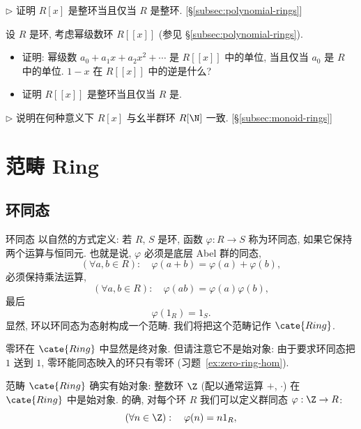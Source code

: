 \begin{prob}
\label{ex:poly-domain}
$\triangleright$ 证明 $R[x]$ 是整环当且仅当 $R$ 是整环. [\S\ref{subsec:polynomial-rings}]
\end{prob}

\begin{prob}
\label{ex:power-series}
设 $R$ 是环, 考虑幂级数环 $R[[x]]$ (参见 \S\ref{subsec:polynomial-rings}).
\begin{itemize}
	\item[(i)] 证明: 幂级数 $a_0 + a_1 x + a_2 x^2 + \cdots$ 是 $R[[x]]$ 中的单位, 当且仅当 $a_0$ 是 $R$ 中的单位. $1 - x$ 在 $R[[x]]$ 中的逆是什么?
	\item[(ii)] 证明 $R[[x]]$ 是整环当且仅当 $R$ 是.
\end{itemize}
\end{prob}

\begin{prob}
\label{ex:poly-monoid-ring}
$\triangleright$ 说明在何种意义下 $R[x]$ 与幺半群环 $R[\N]$ 一致. [\S\ref{subsec:monoid-rings}]
\end{prob}

\section{范畴 Ring}
\label{sec:category-ring}

\subsection{环同态}
\label{subsec:ring-hom}

环同态%
以自然的方式定义: 若 $R$, $S$ 是环, 函数 $\varphi : R \to S$ 称为环同态, 如果它保持两个运算与恒同元. 也就是说, $\varphi$ 必须是底层 Abel 群的同态,
\[
(\forall a, b \in R): \quad \varphi(a + b) = \varphi(a) + \varphi(b),
\]
必须保持乘法运算,
\[
(\forall a, b \in R): \quad \varphi(ab) = \varphi(a)\varphi(b),
\]
最后
\[
\varphi(1_R) = 1_S.
\]
显然, 环以环同态为态射构成一个范畴. 我们将把这个范畴记作 $\cate{Ring}$.

零环在 $\cate{Ring}$ 中显然是终对象. 但请注意它不是始对象: 由于要求环同态把 $1$ 送到 $1$, 零环能同态映入的环只有零环 (习题~\ref{ex:zero-ring-hom}).

范畴 $\cate{Ring}$ 确实有始对象: 整数环 $\Z$ (配以通常运算 $+$, $\cdot$) 在 $\cate{Ring}$ 中是始对象. 的确, 对每个环 $R$ 我们可以定义群同态 $\varphi : \Z \to R$:
\[
(\forall n \in \Z): \quad \varphi(n) = n 1_R,
\]

